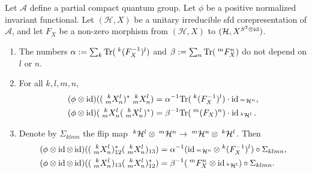 \begin{Theorem} \label{thm:rep-orthogonality} Let $\mathscr{A}$ define a partial
compact quantum group. 
  Let $\phi$ be a positive normalized invariant functional. Let $(\mathcal{H},X)$ be a unitary irreducible sfd corepresentation of $\mathscr{A}$, and let $F_{X}$ be a
  non-zero morphism from $(\mathcal{H},X)$ to $(\mathcal{H},X^{S^{2}
  \otimes \id})$.
  \begin{enumerate}
  \item The numbers $\alpha:=\sum_{k} \Tr(\Gru{(F_{X}^{-1})}{k}{l})$
    and $\beta:=\sum_{n} \Tr(\Gru{F_{X}}{m}{n})$ do not depend on $l$
    or $n$.
  \item  For all $k,l,m,n$,
    \begin{align*}
      (\phi \otimes \id)((\Gr{X}{k}{l}{m}{n})^{*}\Gr{X}{k}{l}{m}{n})
      &=\alpha^{-1}{\Tr(\Gru{(F^{-1}_{X})}{k}{l})} \cdot
      \id_{\Gru{\mathcal{H}}{m}{n}}, \\
      (\phi \otimes \id)(\Gr{X}{k}{l}{m}{n}(\Gr{X}{k}{l}{m}{n})^{*})
      &=\beta^{-1}{\Tr( \Gru{(F_{X})}{m}{n})} \cdot
      \id_{\Gru{\mathcal{H}}{k}{l}}.
    \end{align*}
  \item Denote by $\Sigma_{klmn}$ the flip map $\Gru{\mathcal{H}}{k}{l}
    \otimes \Gru{\mathcal{H}}{m}{n} \to \Gru{\mathcal{H}}{m}{n}
    \otimes \Gru{\mathcal{H}}{k}{l}$. Then
 \begin{align*}
   (\phi \otimes \id \otimes
   \id)((\Gr{X}{k}{l}{m}{n})_{12}^{*}(\Gr{X}{k}{l}{m}{n})_{13}) &=
   \alpha^{-1}
   (\id_{\Gru{\mathcal{H}}{m}{n}} \otimes \Gru{(F_{X}^{-1})}{k}{l})
   \circ \Sigma_{klmn}, \\
   (\phi \otimes \id \otimes
   \id)((\Gr{X}{k}{l}{m}{n})_{13}(\Gr{X}{k}{l}{m}{n})_{12}^{*}) &= \beta^{-1} (\Gru{F_{X}}{m}{n}
   \otimes \id_{\Gru{\mathcal{H}}{k}{l}}) \circ \Sigma_{klmn}.
 \end{align*}
\end{enumerate}
  \end{Theorem}
